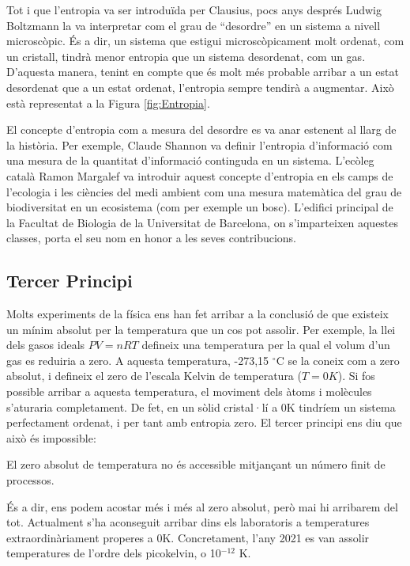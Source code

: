 \documentclass[12pt]{book}
\begin{document}
Tot i que l'entropia va ser introduïda per Clausius, pocs anys després Ludwig Boltzmann la va interpretar com el grau de ``desordre'' en un sistema a nivell microscòpic. És a dir, un sistema que estigui microscòpicament molt ordenat, com un cristall, tindrà menor entropia que un sistema desordenat, com un gas. D'aquesta manera, tenint en compte que és molt més probable arribar a un estat desordenat que a un estat ordenat, l'entropia sempre tendirà a augmentar. Això està representat a la Figura \ref{fig:Entropia}.

El concepte d'entropia com a mesura del desordre es va anar estenent al llarg de la història. Per exemple, Claude Shannon va definir l'entropia d'informació com una mesura de la quantitat d'informació continguda en un sistema. L'ecòleg català Ramon Margalef va introduir aquest concepte d'entropia en els camps de l'ecologia i les ciències del medi ambient com una mesura matemàtica del grau de biodiversitat en un ecosistema (com per exemple un bosc). L'edifici principal de la Facultat de Biologia de la Universitat de Barcelona, on s'imparteixen aquestes classes, porta el seu nom en honor a les seves contribucions.

\subsection{Tercer Principi}

Molts experiments de la física ens han fet arribar a la conclusió de que existeix un mínim absolut per la temperatura que un cos pot assolir. Per exemple, la llei dels gasos ideals $PV = nRT$ defineix una temperatura per la qual el volum d'un gas es reduiria a zero. A aquesta temperatura, -273,15 $^\circ$C se la coneix com a zero absolut, i defineix el zero de l'escala Kelvin de temperatura ($T = 0K$). Si fos possible arribar a aquesta temperatura, el moviment dels àtoms i molècules s'aturaria completament. De fet, en un sòlid cristal·lí a 0K tindríem un sistema perfectament ordenat, i per tant amb entropia zero. El tercer principi ens diu que això és impossible:

\begin{mdframed}
\begin{it}
    El zero absolut de temperatura no és accessible mitjançant un número finit de processos.
\end{it}
\end{mdframed}

És a dir, ens podem acostar més i més al zero absolut, però mai hi arribarem del tot. Actualment s'ha aconseguit arribar dins els laboratoris a temperatures extraordinàriament properes a 0K. Concretament, l'any 2021 es van assolir temperatures de l'ordre dels picokelvin, o 10$^{-12}$ K.
\end{document}
